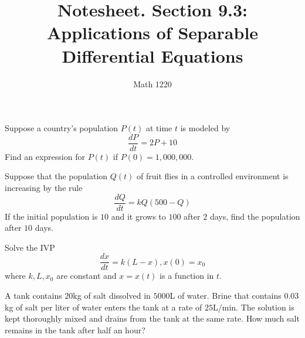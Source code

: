 \documentclass[12pt, a4paper]{article}
\author{Math 1220}
\title{Notesheet. Section 9.3: Applications of Separable Differential Equations}
\date{}
\begin{document}
\maketitle
\nameline
\begin{ex}
  Suppose a country's population \(P(t)\) at time \(t\) is modeled
  by \[
    \frac{dP}{dt} = 2P+10
  \]
  Find an expression for \(P(t)\) if \(P(0)=1,000,000\).
\end{ex}
\begin{ex}
  Suppose that the population \(Q(t)\) of fruit flies
  in a controlled environment is increasing by the rule \[
    \frac{dQ}{dt} = kQ(500-Q)
  \]
  If the initial population is \(10\) and it grows to \(100\) after
  \(2\) days, find the population after \(10\) days.
\end{ex}
\pagebreak
\begin{ex}
  Solve the IVP \[
    \frac{dx}{dt} = k(L-x), x(0)=x_0
  \]
  where \(k,L,x_0\) are constant and \(x = x(t)\) is a function in \(t\).
\end{ex}
\begin{ex}
  A tank contains \(20\)kg of salt dissolved in \(5000\)L of
  water. Brine that contains \(0.03\)kg of salt per liter of water
  enters the tank at a rate of \(25\)L/min. The solution is kept
  thoroughly mixed and drains from the tank at the same rate. How much
  salt remains in the tank after half an hour?
\end{ex}
\end{document}
